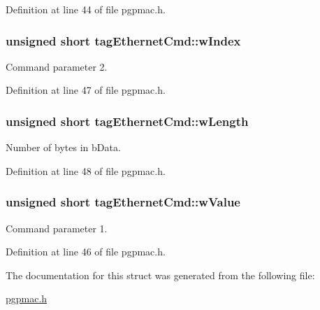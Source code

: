 Definition at line 44 of file pgpmac.h.\hypertarget{structtagEthernetCmd_a92f5a374e87d4f496b64b4888850d6e6}{
\subsubsection[{wIndex}]{\setlength{\rightskip}{0pt plus 5cm}unsigned short {\bf tagEthernetCmd::wIndex}}}
\label{structtagEthernetCmd_a92f5a374e87d4f496b64b4888850d6e6}


Command parameter 2. 

Definition at line 47 of file pgpmac.h.\hypertarget{structtagEthernetCmd_af5df25ff13ca30fa33719d0df1ab7e97}{
\subsubsection[{wLength}]{\setlength{\rightskip}{0pt plus 5cm}unsigned short {\bf tagEthernetCmd::wLength}}}
\label{structtagEthernetCmd_af5df25ff13ca30fa33719d0df1ab7e97}


Number of bytes in bData. 

Definition at line 48 of file pgpmac.h.\hypertarget{structtagEthernetCmd_aec0ee9a5f6c7e3bc6e4bd98f1bd52783}{
\subsubsection[{wValue}]{\setlength{\rightskip}{0pt plus 5cm}unsigned short {\bf tagEthernetCmd::wValue}}}
\label{structtagEthernetCmd_aec0ee9a5f6c7e3bc6e4bd98f1bd52783}


Command parameter 1. 

Definition at line 46 of file pgpmac.h.

The documentation for this struct was generated from the following file:\begin{DoxyCompactItemize}
\item 
\hyperlink{pgpmac_8h}{pgpmac.h}\end{DoxyCompactItemize}
